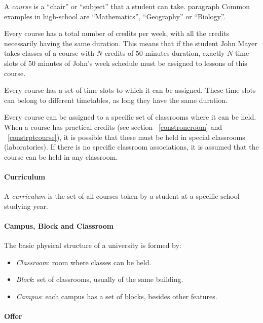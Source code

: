 A \textit{course} is a ``chair'' or ``subject'' that a student can take.
paragraph
Common examples in high-school are ``Mathematics'', ``Geography'' or ``Biology''.

Every course has a total number of credits per week, with all the credits necessarily having the same duration. This means that if the student John Mayer takes classes of a course with $N$ credits of $50$ minutes duration, exactly $N$ time slots of $50$ minutes of John's week schedule must be assigned to lessons of this course.

Every course has a set of time slots to which it can be assigned. These time slots can belong to different timetables, as long they have the same duration.

Every course can be assigned to a specific set of classrooms where it can be held. When a course has practical credits (see section ~\ref{constroneroom} and ~\ref{constrptcourse}), it is possible that these must be held in special classrooms (laboratories). If there is no specific classroom associations, it is assumed that the course can be held in any classroom.


\paragraph{Curriculum}
\label{defcurric}

A \textit{curriculum} is the set of all courses token by a student at a specific school studying year.


\paragraph{Campus, Block and Classroom}
\label{defclassroom}

The basic physical structure of a university is formed by:
\begin{itemize}
\item \textit{Classroom}: room where classes can be held.
\item \textit{Block}: set of classrooms, usually of the same building.
\item \textit{Campus}: each campus has a set of blocks, besides other features.
\end{itemize}


\paragraph{Offer}
\label{defoffer}
 
